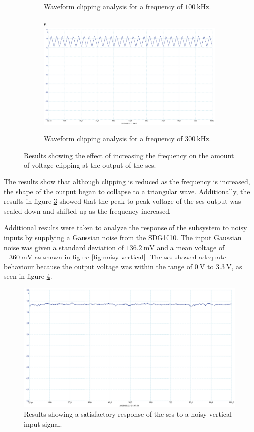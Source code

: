 \documentclass[class=report,11pt,crop=false]{standalone}
\begin{document}
\begin{figure}[ht!]
\begin{subfigure}{.32\textwidth}
			\caption{Waveform clipping analysis for a frequency of $\SI{100}{\kilo\hertz}$.}
			\label{fig:scs-output-08Vpp-100kHz}
		\end{subfigure}
		\begin{subfigure}{.32\textwidth}s
			\centering
			\includegraphics[width=0.95\linewidth]{Figures/Results/scs-output-08Vpp-300kHz}
			\caption{Waveform clipping analysis for a frequency of $\SI{300}{\kilo\hertz}$.}
			\label{fig:scs-output-08Vpp-300kHz}
		\end{subfigure}
		\caption{Results showing the effect of increasing the frequency on the amount of voltage clipping at the output of the \acrshort{scs}.}
		\label{fig:scs-frequency}
	\end{figure} 
	The results show that although clipping is reduced as the frequency is increased, the shape of the output began to collapse to a triangular wave. Additionally, the results in figure \ref{fig:scs-frequency} showed that the peak-to-peak voltage of the \acrshort{scs} output was scaled down and shifted up as the frequency increased. 
	
	Additional results were taken to analyze the response of the subsystem to noisy inputs by supplying a Gaussian noise from the SDG1010. The input Gaussian noise was given a standard deviation of $\SI{136.2}{\milli\volt}$ and a mean voltage of $-\SI{360}{\milli\volt}$ as shown in figure \ref{fig:noisy-vertical}. The \acrshort{scs} showed adequate behaviour because the output voltage was within the range of $\SI{0}{\volt}$ to $\SI{3.3}{\volt}$, as seen in figure \ref{fig:scs-noisy-signal-test}.
	
	\begin{figure}[ht!]
		\centering
		\includegraphics[width=0.55\linewidth]{Figures/Results/scs-noisy-output}
		\caption{Results showing a satisfactory response of the \acrshort{scs} to a noisy vertical input signal.}
		\label{fig:scs-noisy-signal-test}
	\end{figure} 
		
\end{document}
